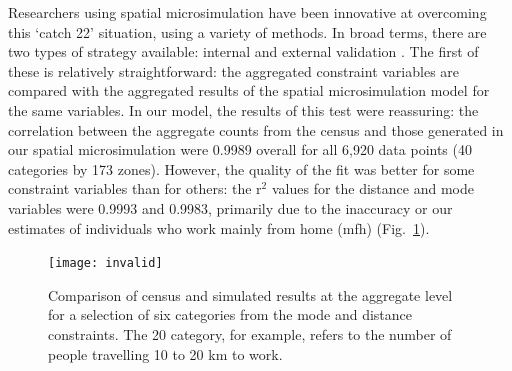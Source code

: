 Researchers using spatial microsimulation have been innovative at
overcoming this `catch 22' situation, using a variety of methods.
In broad terms, there are two types of strategy available:
internal and external validation \citep{edwards2013validation}.
The first of these is relatively
straightforward: the aggregated constraint variables are compared with the
aggregated results of the spatial microsimulation model for the same variables.
In our model, the results of this test were reassuring: the correlation between the
aggregate counts from the census and those generated in our spatial microsimulation
were 0.9989 overall for all 6,920 data points (40 categories by 173 zones).
However, the quality of the fit was better for some constraint variables than
for others: the r$^2$ values for the distance and mode variables were
0.9993 and 0.9983, primarily due to the inaccuracy or our estimates of
individuals who work mainly from home (mfh) (Fig.~\ref{finvalid}).


\begin{figure} \begin{center}
    \texttt{[image: invalid]}
 \end{center}
 \caption[Comparison of census and simulated results at the aggregate level]
 {Comparison of census and simulated results at the aggregate level
 for a selection of six categories from the mode and distance constraints.
 The 20 category, for example, refers to the number of people travelling
 10 to 20 km to work.} \label{finvalid}
\end{figure}


